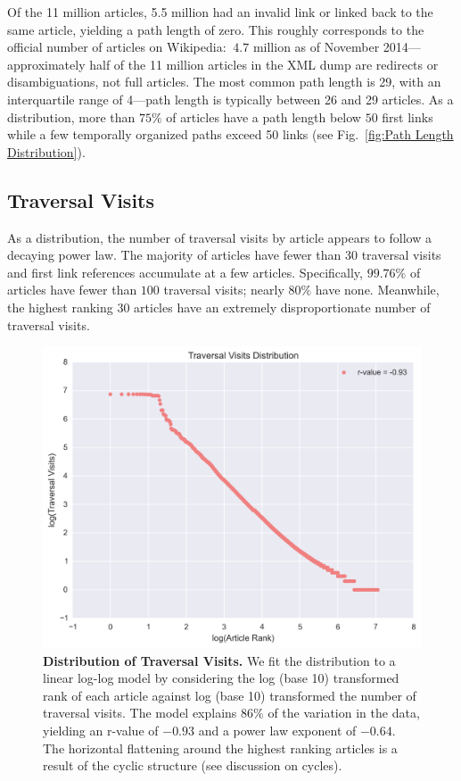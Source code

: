 \documentclass[pre,twocolumn,twoside,superscriptaddress,floatfix, aps, 10pt]{revtex4-1}
\begin{document}
Of the 11 million articles, 5.5 million had an invalid link or linked back to the same article, yielding a path length of zero. 
This roughly corresponds to the official number of articles on Wikipedia: 
$~4.7$ million as of November 2014---approximately half of the 11 million 
articles in the XML dump are redirects or disambiguations, not full articles.
The most common path length is 29, with an interquartile range of 4---path length
is typically between 26 and 29 articles.
As a distribution, more than $75\%$ of articles have a path length below 
$50$ first links 
while a few temporally organized paths exceed 50 links 
(see Fig.~\ref{fig:Path Length Distribution}). 



\subsection{Traversal Visits}

As a distribution, the number of traversal visits by article appears to follow a decaying power law. 
The majority of articles have fewer than 30 traversal visits and
first link references accumulate at a few articles.
Specifically, $99.76\%$ of articles have fewer than $100$ traversal visits; nearly $80\%$ have none. 
Meanwhile, the highest ranking 30 articles have an extremely disproportionate number of traversal visits.

\begin{figure}[tp!]
  \includegraphics[width=\columnwidth]{graphics/traversals_per_article.png} 
  \caption{
    \textbf{Distribution of Traversal Visits.}
We fit the distribution to a linear log-log model by considering the log (base 10) transformed rank of each article against log (base 10) transformed the number of traversal visits. 
The model explains $86\%$ of the variation in the data, yielding an r-value of $-0.93$ 
and a power law exponent of $-0.64$. The horizontal flattening around the highest
ranking articles is a result of the cyclic structure (see discussion on cycles).}
  \label{fig:Distribution of Visits}

\end{figure}
\end{document}
